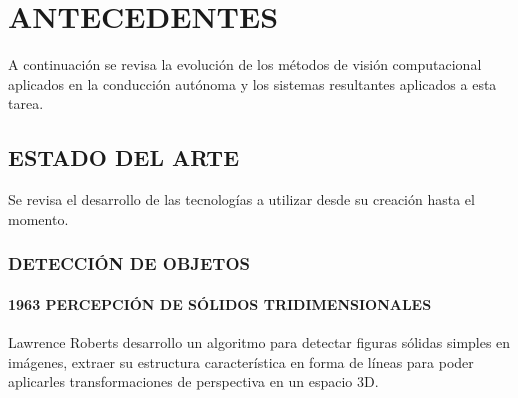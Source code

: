 \section{ANTECEDENTES}
A continuación se revisa la evolución de los métodos de visión computacional aplicados en la conducción autónoma y los sistemas resultantes aplicados a esta tarea.
\subsection{ESTADO DEL ARTE}
Se revisa el desarrollo de las tecnologías a utilizar desde su creación hasta el momento.

\subsubsection{DETECCIÓN DE OBJETOS}
\paragraph{1963 PERCEPCIÓN DE SÓLIDOS TRIDIMENSIONALES}
Lawrence Roberts desarrollo un algoritmo para detectar figuras sólidas simples en imágenes, extraer su estructura característica en forma de líneas para poder aplicarles transformaciones de perspectiva en un espacio 3D. \citep{Roberts_1963}

